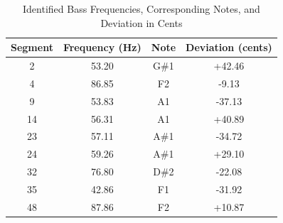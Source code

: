 \begin{table}[H]
    \centering
    \caption{Identified Bass Frequencies, Corresponding Notes, and Deviation in Cents}
    \begin{tabular}{cccc}
        \hline
        Segment & Frequency (Hz) & Note & Deviation (cents) \\
        \hline
        2  & 53.20  & G\#1  & +42.46 \\
        4  & 86.85  & F2    & -9.13  \\
        9  & 53.83  & A1    & -37.13 \\
        14 & 56.31  & A1    & +40.89 \\
        23 & 57.11  & A\#1  & -34.72 \\
        24 & 59.26  & A\#1  & +29.10 \\
        32 & 76.80  & D\#2  & -22.08 \\
        35 & 42.86  & F1    & -31.92 \\
        48 & 87.86  & F2    & +10.87 \\
        \hline
    \end{tabular}
    \label{tab:bass_freq_notes}
\end{table}

